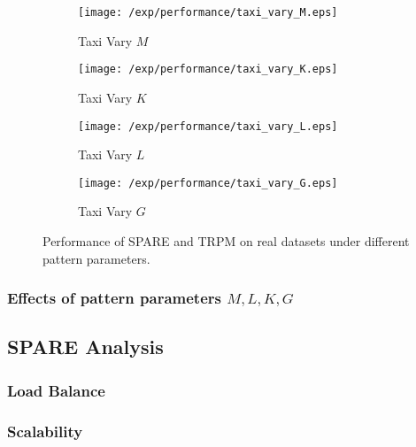 \begin{figure*}[t]
    \begin{subfigure}[b]{0.23\textwidth}
        \texttt{[image: /exp/performance/taxi\_vary\_M.eps]}
        \caption{Taxi Vary $M$}
    \end{subfigure}
    \begin{subfigure}[b]{0.23\textwidth}
        \texttt{[image: /exp/performance/taxi\_vary\_K.eps]}
        \caption{Taxi Vary $K$}
    \end{subfigure}
    \begin{subfigure}[b]{0.23\textwidth}
        \texttt{[image: /exp/performance/taxi\_vary\_L.eps]}
        \caption{Taxi Vary $L$}
    \end{subfigure}
       \begin{subfigure}[b]{0.23\textwidth}
        \texttt{[image: /exp/performance/taxi\_vary\_G.eps]}
        \caption{Taxi Vary $G$}
    \end{subfigure}       
\caption{Performance of SPARE and TRPM on real datasets under different pattern parameters.}
\label{exp:performance_vary}
\end{figure*}


\subsubsection{Effects of pattern parameters $M,L,K,G$}

\subsection{SPARE Analysis}
\subsubsection{Load Balance}
\subsubsection{Scalability}



